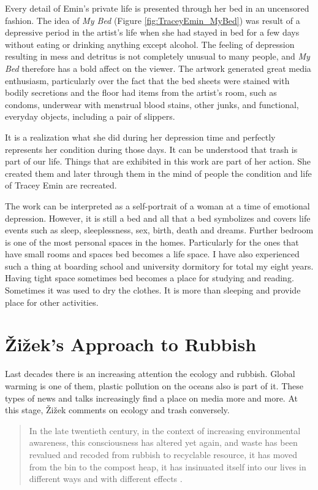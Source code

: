 Every detail of Emin's private life is presented through her bed in an uncensored fashion. The idea of \textit{My Bed} (Figure \ref{fig:TraceyEmin_MyBed}) was result of a depressive period in the artist’s life when she had stayed in bed for a few days without eating or drinking anything except alcohol. The feeling of depression resulting in mess and detritus is not completely unusual to many people, and \textit{My Bed} therefore has a bold affect on the viewer. The artwork generated great media enthusiasm, particularly over the fact that the bed sheets were stained with bodily secretions and the floor had items from the artist’s room, such as condoms, underwear with menstrual blood stains, other junks, and functional, everyday objects, including a pair of slippers. 

It is a realization what she did during her depression time and perfectly represents her condition during those days. It can be understood that trash is part of our life. Things that are exhibited in this work are part of her action. She created them and later through them in the mind of people the condition and life of Tracey Emin are recreated.

The work can be interpreted as a self-portrait of a woman at a time of emotional depression. However, it is still a bed and all that a bed symbolizes and covers life events such as sleep, sleeplessness, sex, birth, death and dreams. Further bedroom is one of the most personal spaces in the homes. Particularly for the ones that have small rooms and spaces bed becomes a life space. I have also experienced such a thing at boarding school and university dormitory for total my eight years. Having tight space sometimes bed becomes a place for studying and reading. Sometimes it was used to dry the clothes. It is more than sleeping and provide place for other activities.



\section{Žižek’s Approach to Rubbish}
Last decades there is an increasing attention the ecology and rubbish. Global warming is one of them, plastic pollution on the oceans also is part of it. These types of news and talks increasingly find a place on media more and more. At this stage, Žižek comments on ecology and trash conversely.

\begin{quote}
In the late twentieth century, in the context of increasing environmental awareness, this consciousness has altered yet again, and waste has been revalued and recoded from rubbish to recyclable resource, it has moved from the bin to the compost heap, it has insinuated itself into our lives in different ways and with different effects \citep[5]{hawkins2005ethics}.
\end{quote}

